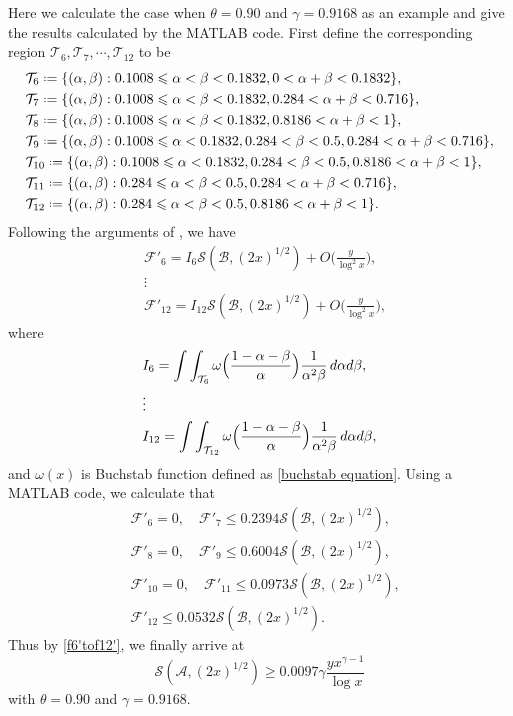 \documentclass[12pt, reqno, twoside, letterpaper]{amsart}
\numberwithin{equation}{section}
\newcommand{\cA}{\ensuremath{\mathcal{A}}}
\newcommand{\cB}{\ensuremath{\mathcal{B}}}
\newcommand{\cF}{\ensuremath{\mathcal{F}}}
\newcommand{\cS}{\ensuremath{\mathcal{S}}}
\newcommand{\cT}{\ensuremath{\mathcal{T}}}
\theoremstyle{customthm}
\theoremstyle{customrem}
\newcommand*{\defeq}{\mathrel{\vcenter{\baselineskip0.5ex \lineskiplimit0pt
			\hbox{\scriptsize.}\hbox{\scriptsize.}}}%
	=}
\def\int{\intop\nolimits}
\begin{document}
Here we calculate the case when $\theta = 0.90$ and $\gamma = 0.9168$ as an example and give the results calculated by the MATLAB code. First define the corresponding region $\cT_6, \cT_7, \cdots, \cT_{12}$ to be
\begin{align*}
	&\cT_6 \defeq \{ (\alpha,\beta) : 0.1008 \leqslant \alpha < \beta < 0.1832, 0 < \alpha + \beta < 0.1832 \},\\
	&\cT_7 \defeq \{ (\alpha,\beta) : 0.1008 \leqslant \alpha < \beta < 0.1832, 0.284 < \alpha + \beta < 0.716 \},\\
	&\cT_8 \defeq \{ (\alpha,\beta) : 0.1008 \leqslant \alpha < \beta < 0.1832, 0.8186 < \alpha + \beta < 1 \},\\
	&\cT_9 \defeq \{ (\alpha,\beta) : 0.1008 \leqslant \alpha < 0.1832, 0.284 < \beta < 0.5, 0.284 < \alpha + \beta < 0.716 \},\\
	&\cT_{10} \defeq \{ (\alpha,\beta) : 0.1008 \leqslant \alpha < 0.1832, 0.284 < \beta < 0.5, 0.8186 < \alpha + \beta < 1 \},\\
	&\cT_{11} \defeq \{ (\alpha,\beta) : 0.284 \leqslant \alpha < \beta < 0.5, 0.284 < \alpha + \beta < 0.716 \},\\
	&\cT_{12} \defeq \{ (\alpha,\beta) : 0.284 \leqslant \alpha < \beta < 0.5, 0.8186 < \alpha + \beta < 1 \}.
\end{align*}
Following the arguments of \cite[Page~14-17]{Ha}, we have
\begin{align*}
	&\cF'_6 = I_6 \cS(\cB,(2x)^{1/2}) + O\Big(\frac{y}{\log ^2x}\Big), \\
	&\vdots \\
	&\cF'_{12} = I_{12} \cS(\cB,(2x)^{1/2}) + O\Big(\frac{y}{\log ^2x}\Big),
\end{align*}
where
\begin{align*}
	&I_6 = \int\int_{\cT_6} \omega\Big(\frac{1-\alpha-\beta}{\alpha}\Big)\frac{1}{\alpha^2 \beta} \, d\alpha d\beta, \\
	&\vdots \\
	&I_{12} = \int\int_{\cT_{12}} \omega\Big(\frac{1-\alpha-\beta}{\alpha}\Big)\frac{1}{\alpha^2 \beta} \, d\alpha d\beta,
\end{align*}
and $\omega(x)$ is Buchstab function defined as \eqref{buchstab equation}.
Using a MATLAB code, we calculate that
\begin{align}\label{f6'tof12'}
	\nonumber&\cF'_6 =0, \quad \cF'_7 \leqslant 0.2394\cS(\cB,(2x)^{1/2}), \\
	\nonumber&\cF'_8 =0, \quad \cF'_9 \leqslant 0.6004\cS(\cB,(2x)^{1/2}), \\
	\nonumber&\cF'_{10} =0, \quad \cF'_{11} \leqslant 0.0973\cS(\cB,(2x)^{1/2}), \\
	&\cF'_{12} \leqslant 0.0532\cS(\cB,(2x)^{1/2}).
\end{align} 
Thus by \eqref{f6'tof12'}, we finally arrive at
$$
\cS(\cA,(2x)^{1/2}) \geqslant 0.0097\gamma \frac{yx^{\gamma-1}}{\log x}
$$
with $\theta=0.90$ and $\gamma=0.9168$.
\end{document}

